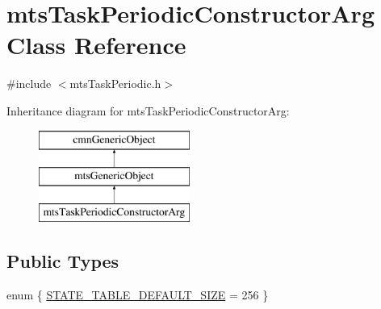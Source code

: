 \hypertarget{classmts_task_periodic_constructor_arg}{}\section{mts\+Task\+Periodic\+Constructor\+Arg Class Reference}
\label{classmts_task_periodic_constructor_arg}


{\ttfamily \#include $<$mts\+Task\+Periodic.\+h$>$}

Inheritance diagram for mts\+Task\+Periodic\+Constructor\+Arg\+:\begin{figure}[H]
\begin{center}
\leavevmode
\includegraphics[height=3.000000cm]{d2/d2d/classmts_task_periodic_constructor_arg}
\end{center}
\end{figure}
\subsection*{Public Types}
\begin{DoxyCompactItemize}
\item 
enum \{ \hyperlink{classmts_task_periodic_constructor_arg_a26e076204c3149fe911725c21e2a0e94a636d05314de683eba7b7c31f0627f5cb}{S\+T\+A\+T\+E\+\_\+\+T\+A\+B\+L\+E\+\_\+\+D\+E\+F\+A\+U\+L\+T\+\_\+\+S\+I\+Z\+E} = 256
 \}
\end{DoxyCompactItemize}
